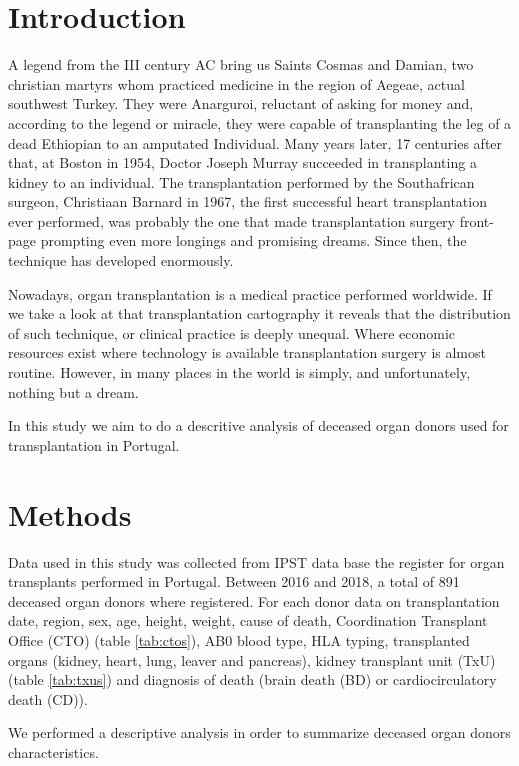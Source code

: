 \documentclass[]{book}
\begin{document}
\chapter{Introduction}\label{intro}

A legend from the III century AC bring us Saints Cosmas and Damian, two
christian martyrs whom practiced medicine in the region of Aegeae,
actual southwest Turkey. They were Anarguroi, reluctant of asking for
money and, according to the legend or miracle, they were capable of
transplanting the leg of a dead Ethiopian to an amputated Individual.
Many years later, 17 centuries after that, at Boston in 1954, Doctor
Joseph Murray succeeded in transplanting a kidney to an individual. The
transplantation performed by the Southafrican surgeon, Christiaan
Barnard in 1967, the first successful heart transplantation ever
performed, was probably the one that made transplantation surgery
front-page prompting even more longings and promising dreams. Since
then, the technique has developed enormously.

Nowadays, organ transplantation is a medical practice performed
worldwide. If we take a look at that transplantation cartography it
reveals that the distribution of such technique, or clinical practice is
deeply unequal. Where economic resources exist where technology is
available transplantation surgery is almost routine. However, in many
places in the world is simply, and unfortunately, nothing but a dream.

In this study we aim to do a descritive analysis of deceased organ
donors used for transplantation in Portugal.

\chapter{Methods}\label{method}

Data used in this study was collected from IPST data base the register
for organ transplants performed in Portugal. Between 2016 and 2018, a
total of 891 deceased organ donors where registered. For each donor data
on transplantation date, region, sex, age, height, weight, cause of
death, Coordination Transplant Office (CTO) (table \ref{tab:ctos}), AB0
blood type, HLA typing, transplanted organs (kidney, heart, lung, leaver
and pancreas), kidney transplant unit (TxU) (table \ref{tab:txus}) and
diagnosis of death (brain death (BD) or cardiocirculatory death (CD)).

We performed a descriptive analysis in order to summarize deceased organ
donors characteristics.
\end{document}

